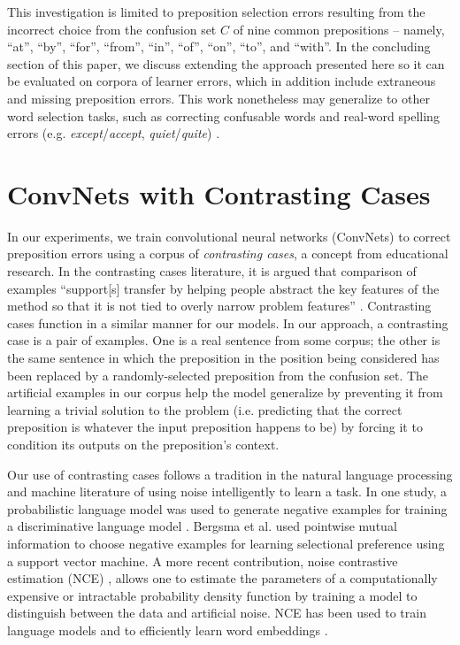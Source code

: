 This investigation is limited to preposition selection errors resulting from the incorrect choice from the confusion set $C$ of nine common prepositions -- namely, ``at'', ``by'', ``for'', ``from'', ``in'', ``of'', ``on'', ``to'', and ``with''.  In the concluding section of this paper, we discuss extending the approach presented here so it can be evaluated on corpora of learner errors, which in addition include extraneous and missing preposition errors.  This work nonetheless may generalize to other word selection tasks, such as correcting confusable words and real-word spelling errors (e.g. \textit{except}/\textit{accept}, \textit{quiet}/\textit{quite}) \cite{kukich1992techniques}.

\section{ConvNets with Contrasting Cases}

In our experiments, we train convolutional neural networks (ConvNets) \cite{LeCun98,collobert2008unified} to correct preposition errors using a corpus of \textit{contrasting cases}, a concept from educational research.  In the contrasting cases literature, it is argued that comparison of examples ``support[s] transfer by helping people abstract the key features of the method so that it is not tied to overly narrow problem features'' \cite{rittle20117}.  Contrasting cases function in a similar manner for our models.  In our approach, a contrasting case is a pair of examples.  One is a real sentence from some corpus; the other is the same sentence in which the preposition in the position being considered has been replaced by a randomly-selected preposition from the confusion set.  The artificial examples in our corpus help the model generalize by preventing it from learning a trivial solution to the problem (i.e. predicting that the correct preposition is whatever the input preposition happens to be) by forcing it to condition its outputs on the preposition's context.  

Our use of contrasting cases follows a tradition in the natural language processing and machine literature of using noise intelligently to learn a task.  In one study, a probabilistic language model was used to generate negative examples for training a discriminative language model   \cite{tsujiiythu2007discriminative,cherry2008discriminative}. Bergsma et al. \cite{bergsma2008discriminative} used pointwise mutual information to choose negative examples for learning selectional preference using a support vector machine.  A more recent contribution, noise contrastive estimation (NCE) \cite{gutmann2010noise}, allows one to estimate the parameters of a computationally expensive or intractable probability density function by training a model to distinguish between the data and artificial noise.  NCE has been used to train language models \cite{ICML2012Mnih_855} and to efficiently learn word embeddings \cite{mnih2013learning,NIPS2013_5021}.

